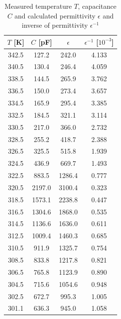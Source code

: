\documentclass[a4paper,12pt]{article}
\begin{document}
    \begin{table}[H]
        \begin{center}
            \caption{Measured temperature $T$, capacitance $C$ and calculated permittivity $\epsilon$ and inverse of permittivity $\epsilon^{-1}$}
            \label{tab:vn}
            \begin{tabular}{|c|c|c|c|}
                \hline
                $T$ [K] & $C$ [pF] & $\epsilon$ & $\epsilon^{-1}$ [$10^{-3}$] \\ \hline
                342.5 & 127.2 & 242.0 & 4.133\\
                340.5 & 130.4 & 246.4 & 4.059\\
                338.5 & 144.5 & 265.9 & 3.762\\
                336.5 & 150.0 & 273.4 & 3.657\\
                334.5 & 165.9 & 295.4 & 3.385\\
                332.5 & 184.5 & 321.1 & 3.114\\
                330.5 & 217.0 & 366.0 & 2.732\\
                328.5 & 255.2 & 418.7 & 2.388\\
                326.5 & 325.5 & 515.8 & 1.939\\
                324.5 & 436.9 & 669.7 & 1.493\\
                322.5 & 883.5 & 1286.4 & 0.777\\
                320.5 & 2197.0 & 3100.4 & 0.323\\
                318.5 & 1573.1 & 2238.8 & 0.447\\
                316.5 & 1304.6 & 1868.0 & 0.535\\
                314.5 & 1136.6 & 1636.0 & 0.611\\
                312.5 & 1009.4 & 1460.3 & 0.685\\
                310.5 & 911.9 & 1325.7 & 0.754\\
                308.5 & 833.8 & 1217.8 & 0.821\\
                306.5 & 765.8 & 1123.9 & 0.890\\
                304.5 & 715.6 & 1054.6 & 0.948\\
                302.5 & 672.7 & 995.3 & 1.005\\
                301.1 & 636.3 & 945.0 & 1.058\\
                \hline
            \end{tabular}
        \end{center}
    \end{table}
\end{document}
